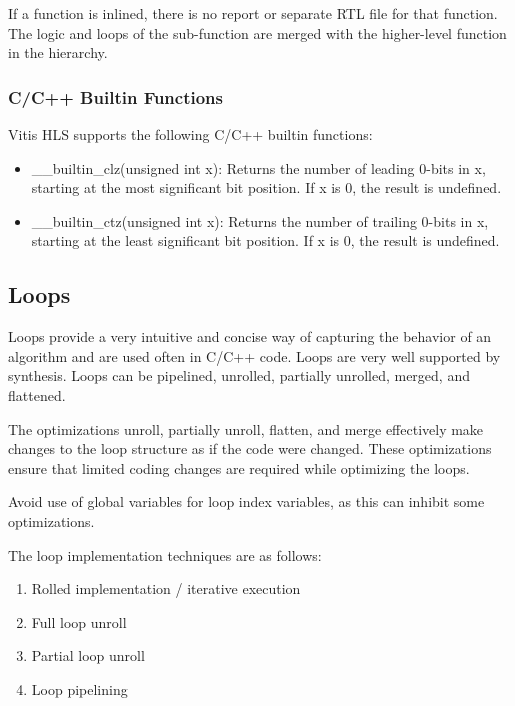If a function is inlined, there is no report or separate RTL file for that function. The logic and loops of the sub-function are merged with the higher-level function in the hierarchy.

\subsubsection{C/C++ Builtin Functions}
Vitis HLS supports the following C/C++ builtin functions:
\begin{itemize}
  \item \_\_builtin\_clz(unsigned int x): Returns the number of leading 0-bits in x, starting at the most significant bit position. If x is 0, the result is undefined.
  \item \_\_builtin\_ctz(unsigned int x): Returns the number of trailing 0-bits in x, starting at the least significant bit position. If x is 0, the result is undefined.
\end{itemize}

\subsection{Loops}
Loops provide a very intuitive and concise way of capturing the behavior of an algorithm and are used often in C/C++ code. Loops are very well supported by synthesis. Loops can be pipelined, unrolled, partially unrolled, merged, and flattened.

\par The optimizations unroll, partially unroll, flatten, and merge effectively make changes to the loop structure as if the code were changed. These optimizations ensure that limited coding changes are required while optimizing the loops.

\begin{highlight}
  Avoid use of global variables for loop index variables, as this can inhibit some optimizations.
\end{highlight} 

The loop implementation techniques are as follows:
\begin{enumerate}
  \item Rolled implementation / iterative execution
  \item Full loop unroll
  \item Partial loop unroll
  \item Loop pipelining
\end{enumerate}

